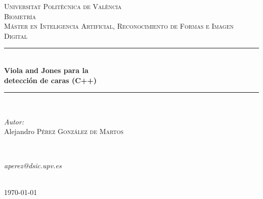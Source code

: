 \documentclass[11pt,spanish,a4paper]{article} %
\begin{document}

\begin{titlepage}

\newcommand{\HRule}{\rule{\linewidth}{0.5mm}} %

\center %

\textsc{\LARGE Universitat Politècnica de València}\\[1.5cm] %
\textsc{\Large Biometría}\\[2.5cm] %
\textsc{\large Máster en Inteligencia Artificial, Reconocimiento de Formas e Imagen Digital}\\[1.5cm] %

\HRule \\[0.4cm]
{ \Huge \bfseries Viola and Jones para la\\\vspace{0.8em} detección de caras (C++)}\\[0.4cm] %
\HRule \\[2.5cm]

\begin{minipage}{0.4\textwidth}
\begin{flushleft} \large
\emph{Autor:}\\
Alejandro \textsc{Pérez González de Martos}
\end{flushleft}
\end{minipage}
~
\begin{minipage}{0.4\textwidth}
\begin{flushright} \large
\emph{aperez@dsic.upv.es} \\
\end{flushright}
\end{minipage}\\[3cm]

{\large \today}\\[1cm] %


\vfill %

\end{titlepage}
\end{document}
